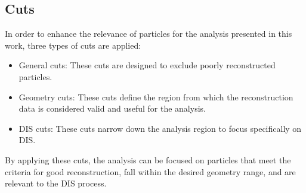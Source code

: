 \subsection{Cuts}
\label{13.20::cuts}
    In order to enhance the relevance of particles for the analysis presented in this work, three types of cuts are applied:
    \begin{itemize}
        \item
            General cuts:
            These cuts are designed to exclude poorly reconstructed particles.
        \item
            Geometry cuts:
            These cuts define the region from which the reconstruction data is considered valid and useful for the analysis.
        \item
            DIS cuts:
            These cuts narrow down the analysis region to focus specifically on DIS.
    \end{itemize}
    By applying these cuts, the analysis can be focused on particles that meet the criteria for good reconstruction, fall within the desired geometry range, and are relevant to the DIS process.

    
    
    
